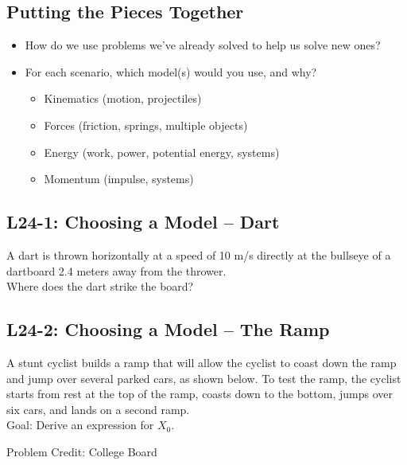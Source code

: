 \documentclass[]{article}
\newcommand{\Week}{24}
\begin{document}
\begin{PresentSpace}
\vspace{-10pt}
\section*{Putting the Pieces Together}
\vspace{-10pt}
\begin{itemize}
	\item How do we use problems we've already solved to help us solve new ones?
	\item For each scenario, which model(s) would you use, and why?
	\begin{itemize}
		\item Kinematics (motion, projectiles)
		\item Forces (friction, springs, multiple objects)
		\item Energy (work, power, potential energy, systems)
		\item Momentum (impulse, systems)
	\end{itemize}
\end{itemize}
\end{PresentSpace}
\newpage
\begin{TeacherMargin}

\end{TeacherMargin}
\begin{PresentSpace}
\vspace{-10pt}
\section*{L\Week-1: Choosing a Model -- Dart}
\vspace{-5pt}
A dart is thrown horizontally at a speed of 10 m/s directly at the bullseye of a dartboard 2.4 meters away from the thrower. \\

\noindent Where does the dart strike the board?
\end{PresentSpace}
\newpage
\begin{TeacherMargin}

\end{TeacherMargin}
\begin{PresentSpace}
\vspace{-10pt}
\section*{L\Week-2: Choosing a Model -- The Ramp}
\vspace{-5pt}
A stunt cyclist builds a ramp that will allow the cyclist to coast down the ramp and jump over several parked cars, as shown below. To test the ramp, the cyclist starts from rest at the top of the ramp, coasts down to the bottom, jumps over six cars, and lands on a second ramp. \\

\noindent Goal: Derive an expression for $X_{0}$.
\begin{center}
	\small
	Problem Credit: College Board 
\end{center}
\end{PresentSpace}
\end{document}
